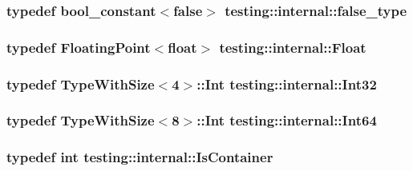 \subsubsection[{\texorpdfstring{false\+\_\+type}{false_type}}]{\setlength{\rightskip}{0pt plus 5cm}typedef {\bf bool\+\_\+constant}$<$false$>$ {\bf testing\+::internal\+::false\+\_\+type}}\hypertarget{namespacetesting_1_1internal_abb1d0789f19bdde21affccbd1078b525}{}\label{namespacetesting_1_1internal_abb1d0789f19bdde21affccbd1078b525}
\subsubsection[{\texorpdfstring{Float}{Float}}]{\setlength{\rightskip}{0pt plus 5cm}typedef {\bf Floating\+Point}$<$float$>$ {\bf testing\+::internal\+::\+Float}}\hypertarget{namespacetesting_1_1internal_a02e1981f5ff70609e6ac06e006ff519a}{}\label{namespacetesting_1_1internal_a02e1981f5ff70609e6ac06e006ff519a}
\subsubsection[{\texorpdfstring{Int32}{Int32}}]{\setlength{\rightskip}{0pt plus 5cm}typedef {\bf Type\+With\+Size}$<$4$>$\+::Int {\bf testing\+::internal\+::\+Int32}}\hypertarget{namespacetesting_1_1internal_a8ee38faaf875f133358abaf9bc056cec}{}\label{namespacetesting_1_1internal_a8ee38faaf875f133358abaf9bc056cec}
\subsubsection[{\texorpdfstring{Int64}{Int64}}]{\setlength{\rightskip}{0pt plus 5cm}typedef {\bf Type\+With\+Size}$<$8$>$\+::Int {\bf testing\+::internal\+::\+Int64}}\hypertarget{namespacetesting_1_1internal_a271c563fec38b804ddab0677f51f70a8}{}\label{namespacetesting_1_1internal_a271c563fec38b804ddab0677f51f70a8}
\subsubsection[{\texorpdfstring{Is\+Container}{IsContainer}}]{\setlength{\rightskip}{0pt plus 5cm}typedef int {\bf testing\+::internal\+::\+Is\+Container}}\hypertarget{namespacetesting_1_1internal_ad8f0c2883245f1df2a53618a49f0deb3}{}\label{namespacetesting_1_1internal_ad8f0c2883245f1df2a53618a49f0deb3}
